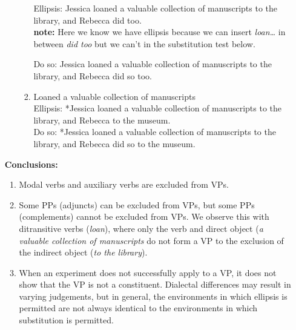 \documentclass[a4paper,12pt]{article}
\begin{document}
\begin{enumerate}
\begin{enumerate}[label=(\alph*)]
\begin{enumerate}[label=(\roman*)]
                  Ellipsis: Jessica loaned a valuable collection of manuscripts to the library, and Rebecca did too.\\
                  \textbf{note:} Here we know we have ellipsis because we can insert \textit{loan\dots} in between \textit{did too} but we can't in the substitution test below.

                  Do so: Jessica loaned a valuable collection of manuscripts to the library, and Rebecca did so too.

               \item Loaned a valuable collection of manuscripts\\
                  Ellipsis: *Jessica loaned a valuable collection of manuscripts to the library, and Rebecca to the museum.\\
                  Do so: *Jessica loaned a valuable collection of manuscripts to the library, and Rebecca did so to the museum.

               \end{enumerate}
      \end{enumerate}

   \textbf{Conclusions:}
   \begin{enumerate}[label=(\roman*)]
      \item Modal verbs and auxiliary verbs are excluded from VPs.

      \item Some PPs (adjuncts) can be excluded from VPs, but some PPs (complements) cannot be excluded from VPs. We observe this with ditransitive verbs (\textit{loan}), where only the verb and direct object (\textit{a valuable collection of manuscripts} do not form a VP to the exclusion of the indirect object (\textit{to the library}).

      \item When an experiment does not successfully apply to a VP, it does not show that the VP is not a constituent. Dialectal differences may result in varying judgements, but in general, the environments in which ellipsis is permitted are not always identical to the environments in which substitution is permitted.
   \end{enumerate}
\end{enumerate}


            
\end{document}
